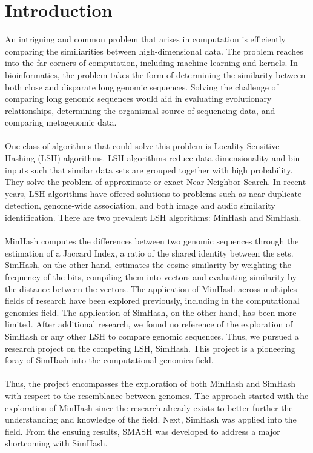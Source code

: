 \documentclass[12pt, letterpaper]{article}
\begin{document}
\section{Introduction}
An intriguing and common problem that arises in computation is efficiently comparing the similiarities between high-dimensional data. The problem reaches into the far corners of computation, including machine learning and kernels. In bioinformatics, the problem takes the form of determining the similarity between both close and disparate long genomic sequences. Solving the challenge of comparing long genomic sequences would aid in evaluating evolutionary relationships, determining the organismal source of sequencing data, and comparing metagenomic data. \\ \\
One class of algorithms that could solve this problem is Locality-Sensitive Hashing (LSH) algorithms. LSH algorithms reduce data dimensionality and bin inputs such that similar data sets are grouped together with high probability. They solve the problem of approximate or exact Near Neighbor Search. In recent years, LSH algorithms have offered solutions to problems such as near-duplicate detection, genome-wide association, and both image and audio similarity identification. There are two prevalent LSH algorithms: MinHash and SimHash. \\ \\
MinHash computes the differences between two genomic sequences through the estimation of a Jaccard Index, a ratio of the shared identity between the sets. SimHash, on the other hand, estimates the cosine similarity by weighting the frequency of the bits, compiling them into vectors and evaluating similarity by the distance between the vectors. The application of MinHash across multiples fields of research have been explored previously, including in the computational genomics field. The application of SimHash, on the other hand, has been more limited. After additional research, we found no reference of the exploration of SimHash or any other LSH to compare genomic sequences. Thus, we pursued a research project on the competing LSH, SimHash. This project is a pioneering foray of SimHash into the computational genomics field. \\ \\
Thus, the project encompasses the exploration of both MinHash and SimHash with respect to the resemblance between genomes. The approach started with the exploration of MinHash since the research already exists to better further the understanding and knowledge of the field. Next, SimHash was applied into the field. From the ensuing results, SMASH was developed to address a major shortcoming with SimHash.
\end{document}
